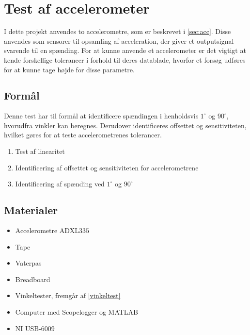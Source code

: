 \section{Test af accelerometer} 
\label{sec:test_acc}
I dette projekt anvendes to accelerometre, som er beskrevet i \autoref{sec:acc}. Disse anvendes som sensorer til opsamling af acceleration, der giver et outputsignal svarende til en spænding. For at kunne anvende et accelerometer er det vigtigt at kende forskellige tolerancer i forhold til deres datablade, hvorfor et forsøg udføres for at kunne tage højde for disse parametre.

\subsection{Formål}
Denne test har til formål at identificere spændingen i henholdsvis $1^{\circ}$ og $90^{\circ}$, hvorudfra vinkler kan beregnes. Derudover identificeres %
offsettet og sensitiviteten, hvilket gøres for at teste accelerometrenes tolerancer.

\begin{enumerate}
\item Test af linearitet
\item Identificering af offsettet og sensitiviteten for accelerometrene
\item Identificering af spænding ved $1^{\circ}$ og $90^{\circ}$
\end{enumerate}

\subsection{Materialer}
\begin{itemize}
\item Accelerometre ADXL$335$
\item Tape
\item Vaterpas
\item Breadboard
\item Vinkeltester, fremgår af \autoref{vinkeltest}
\item Computer med Scopelogger og MATLAB
\item NI USB-6009
\end{itemize}

